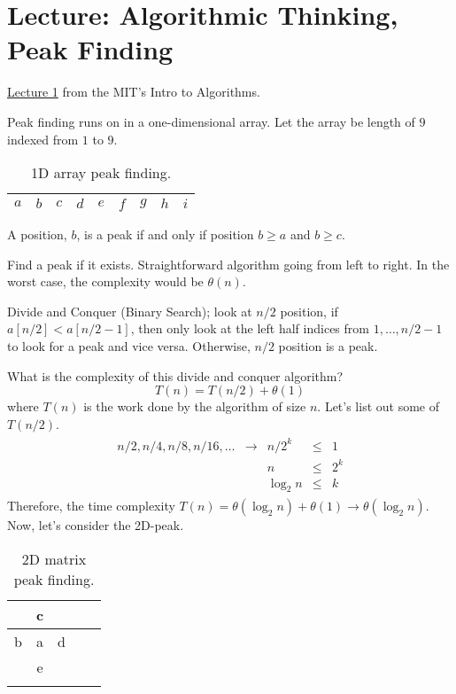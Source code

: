 \chapter{Lecture: Algorithmic Thinking, Peak Finding}
\href{https://ocw.mit.edu/courses/electrical-engineering-and-computer-science/6-006-introduction-to-algorithms-fall-2011/lecture-videos/lecture-1-algorithmic-thinking-peak-finding/}{Lecture 1} from the MIT's 
Intro to Algorithms.

Peak finding runs on in a one-dimensional array. Let the array be length of \(9\) indexed
from \(1\) to \(9\). 
\begin{table}[H]
	\centering
	\begin{tabular}{| *{9}{|c|} |}
  		\hline			
  		\(a\) & \(b\) & \(c\) & \(d\) & \(e\) & \(f\) & \(g\) & \(h\) & \(i\)\\
  		\hline  
	\end{tabular}
	\caption{1D array peak finding.}
	\label{tab1:dpeak}
\end{table}
\begin{definition}
	A position, \(b\), is a peak if and only if position \(b\geq a\) and \(b\geq c\).
\end{definition}
\noindent
Find a peak if it exists. Straightforward algorithm going from left to right. In the worst case, 
the complexity would be \(\theta(n)\). 
\begin{definition}
	Divide and Conquer (Binary Search); look at \(n / 2\) position, if \(a[n/2] < a[n / 2 - 1]\), then only look 
	at the left half indices from \(1,\ldots, n / 2 -1\) to look for a peak and vice versa. Otherwise, \(n / 2\)
	position is a peak.
\end{definition}
\noindent
What is the complexity of this divide and conquer algorithm?
\[
	T(n) = T(n / 2) + \theta(1)
\]
where \(T(n)\) is the work done by the algorithm of size \(n\). Let's list out some of \(T(n / 2)\).
\begin{align*}
	\begin{aligned}
		n / 2, n / 4, n / 8, n / 16, \ldots & \rightarrow & n / 2^k & \leq & 1\\
		& & n & \leq & 2^k\\
		& & \log_2 n & \leq & k
	\end{aligned}
\end{align*}
Therefore, the time complexity \(T(n) = \theta(\log_2 n) + \theta(1) \rightarrow \theta(\log_2 n)\).
Now, let's consider the 2D-peak. 
\begin{table}[H]
	\centering
	\begin{tabular}{| *{5}{|c|} |}
		\hline
		   & c & & & \\
		\hline
		b & a & d & & \\
		\hline
		   & e & & & \\
		\hline
		   & & & & \\
		\hline
	\end{tabular}
	\caption{2D matrix peak finding.}
	\label{tab1:dpeak2d}
\end{table}
